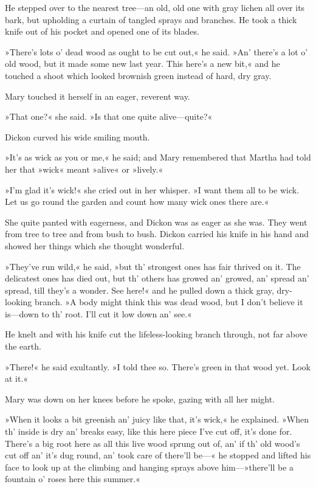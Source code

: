 He stepped over to the nearest tree—an old, old one with gray lichen all over its bark, but upholding a curtain of tangled sprays and branches. He took a thick knife out of his pocket and opened one of its blades.

»There's lots o' dead wood as ought to be cut out,« he said. »An' there's a lot o' old wood, but it made some new last year. This here's a new bit,« and he touched a shoot which looked brownish green instead of hard, dry gray.

Mary touched it herself in an eager, reverent way.

»That one?« she said. »Is that one quite alive—quite?«

Dickon curved his wide smiling mouth.

»It's as wick as you or me,« he said; and Mary remembered that Martha had told her that »wick« meant »alive« or »lively.«

»I'm glad it's wick!« she cried out in her whisper. »I want them all to be wick. Let us go round the garden and count how many wick ones there are.«

She quite panted with eagerness, and Dickon was as eager as she was. They went from tree to tree and from bush to bush. Dickon carried his knife in his hand and showed her things which she thought wonderful.

»They've run wild,« he said, »but th' strongest ones has fair thrived on it. The delicatest ones has died out, but th' others has growed an' growed, an' spread an' spread, till they's a wonder. See here!« and he pulled down a thick gray, dry-looking branch. »A body might think this was dead wood, but I don't believe it is—down to th' root. I'll cut it low down an' see.«

He knelt and with his knife cut the lifeless-looking branch through, not far above the earth.

»There!« he said exultantly. »I told thee so. There's green in that wood yet. Look at it.«

Mary was down on her knees before he spoke, gazing with all her might.

»When it looks a bit greenish an' juicy like that, it's wick,« he explained. »When th' inside is dry an' breaks easy, like this here piece I've cut off, it's done for. There's a big root here as all this live wood sprung out of, an' if th' old wood's cut off an' it's dug round, an' took care of there'll be—« he stopped and lifted his face to look up at the climbing and hanging sprays above him—»there'll be a fountain o' roses here this summer.«

